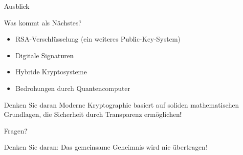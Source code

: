 \documentclass[handout]{beamer}
\begin{document}
\begin{frame}{Ausblick}
\begin{block}{Was kommt als Nächstes?}
\begin{itemize}
    \item RSA-Verschlüsselung (ein weiteres Public-Key-System)
    \item Digitale Signaturen
    \item Hybride Kryptosysteme
    \item Bedrohungen durch Quantencomputer
\end{itemize}
\end{block}

\pause

\begin{alertblock}{Denken Sie daran}
Moderne Kryptographie basiert auf soliden mathematischen Grundlagen, die Sicherheit durch Transparenz ermöglichen!
\end{alertblock}
\end{frame}

\begin{frame}
\begin{center}
{\Huge Fragen?}

\vspace{1cm}

\large
Denken Sie daran: Das gemeinsame Geheimnis wird nie übertragen!
\end{center}
\end{frame}
\end{document}
